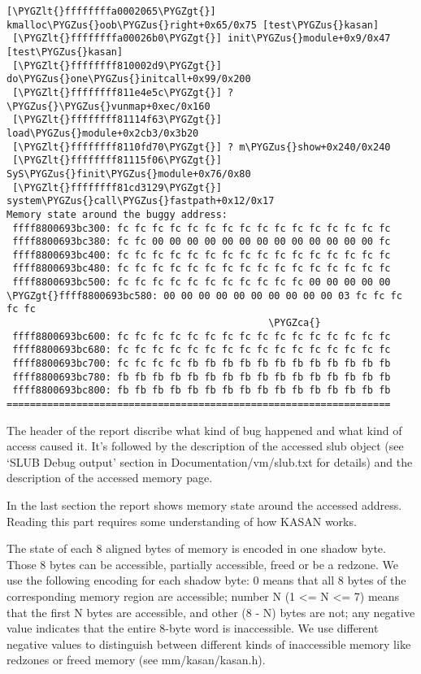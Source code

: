 \documentclass[a4paper,8pt,english]{sphinxmanual}
\def\PYGZus{\char`\_}
\def\PYGZca{\char`\^}
\def\PYGZlt{\char`\<}
\def\PYGZgt{\char`\>}
\begin{document}
\begin{Verbatim}[commandchars=\\\{\}]
 [\PYGZlt{}ffffffffa0002065\PYGZgt{}] kmalloc\PYGZus{}oob\PYGZus{}right+0x65/0x75 [test\PYGZus{}kasan]
 [\PYGZlt{}ffffffffa00026b0\PYGZgt{}] init\PYGZus{}module+0x9/0x47 [test\PYGZus{}kasan]
 [\PYGZlt{}ffffffff810002d9\PYGZgt{}] do\PYGZus{}one\PYGZus{}initcall+0x99/0x200
 [\PYGZlt{}ffffffff811e4e5c\PYGZgt{}] ? \PYGZus{}\PYGZus{}vunmap+0xec/0x160
 [\PYGZlt{}ffffffff81114f63\PYGZgt{}] load\PYGZus{}module+0x2cb3/0x3b20
 [\PYGZlt{}ffffffff8110fd70\PYGZgt{}] ? m\PYGZus{}show+0x240/0x240
 [\PYGZlt{}ffffffff81115f06\PYGZgt{}] SyS\PYGZus{}finit\PYGZus{}module+0x76/0x80
 [\PYGZlt{}ffffffff81cd3129\PYGZgt{}] system\PYGZus{}call\PYGZus{}fastpath+0x12/0x17
Memory state around the buggy address:
 ffff8800693bc300: fc fc fc fc fc fc fc fc fc fc fc fc fc fc fc fc
 ffff8800693bc380: fc fc 00 00 00 00 00 00 00 00 00 00 00 00 00 fc
 ffff8800693bc400: fc fc fc fc fc fc fc fc fc fc fc fc fc fc fc fc
 ffff8800693bc480: fc fc fc fc fc fc fc fc fc fc fc fc fc fc fc fc
 ffff8800693bc500: fc fc fc fc fc fc fc fc fc fc fc 00 00 00 00 00
\PYGZgt{}ffff8800693bc580: 00 00 00 00 00 00 00 00 00 00 03 fc fc fc fc fc
                                             \PYGZca{}
 ffff8800693bc600: fc fc fc fc fc fc fc fc fc fc fc fc fc fc fc fc
 ffff8800693bc680: fc fc fc fc fc fc fc fc fc fc fc fc fc fc fc fc
 ffff8800693bc700: fc fc fc fc fb fb fb fb fb fb fb fb fb fb fb fb
 ffff8800693bc780: fb fb fb fb fb fb fb fb fb fb fb fb fb fb fb fb
 ffff8800693bc800: fb fb fb fb fb fb fb fb fb fb fb fb fb fb fb fb
==================================================================
\end{Verbatim}

The header of the report discribe what kind of bug happened and what kind of
access caused it. It's followed by the description of the accessed slub object
(see `SLUB Debug output' section in Documentation/vm/slub.txt for details) and
the description of the accessed memory page.

In the last section the report shows memory state around the accessed address.
Reading this part requires some understanding of how KASAN works.

The state of each 8 aligned bytes of memory is encoded in one shadow byte.
Those 8 bytes can be accessible, partially accessible, freed or be a redzone.
We use the following encoding for each shadow byte: 0 means that all 8 bytes
of the corresponding memory region are accessible; number N (1 \textless{}= N \textless{}= 7) means
that the first N bytes are accessible, and other (8 - N) bytes are not;
any negative value indicates that the entire 8-byte word is inaccessible.
We use different negative values to distinguish between different kinds of
inaccessible memory like redzones or freed memory (see mm/kasan/kasan.h).
\end{document}
